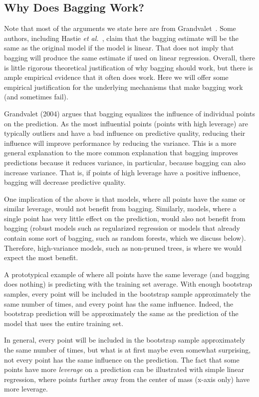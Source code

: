 \begin{refsection}
\subsection*{Why Does Bagging Work?}

Note that most of the arguments we state here are from Grandvalet~\cite{Grandvalet2004}. Some authors, including Hastie {\em et al.}~\cite{2016-Hastie}, claim that the bagging estimate will be the same as the original model if the model is linear. That does not imply that bagging will produce the same estimate if used on linear regression. Overall, there is little rigorous theoretical justification of why bagging should work, but there is ample empirical evidence that it often does work. Here we will offer some empirical justification for the underlying mechanisms that make bagging work (and sometimes fail).

Grandvalet (2004) argues that bagging equalizes the influence of individual points on the prediction. As the most influential points (points with high leverage) are typically outliers and have a bad influence on predictive quality, reducing their influence will improve performance by reducing the variance. This is a more general explanation to the more common explanation that bagging improves predictions because it reduces variance, in particular, because bagging can also increase variance. That is, if points of high leverage have a positive influence, bagging will decrease predictive quality.

One implication of the above is that models, where all points have the same or similar leverage, would not benefit from bagging. Similarly, models, where a single point has very little effect on the prediction, would also not benefit from bagging (robust models such as regularized regression or models that already contain some sort of bagging, such as random forests, which we discuss below). Therefore, high-variance models, such as non-pruned trees, is where we would expect the most benefit.

A prototypical example of where all points have the same leverage (and bagging does nothing) is predicting with the training set average. With enough bootstrap samples, every point will be included in the bootstrap sample approximately the same number of times, and every point has the same influence. Indeed, the bootstrap prediction will be approximately the same as the prediction of the model that uses the entire training set.

In general, every point will be included in the bootstrap sample approximately the same number of times, but what is at first maybe even somewhat surprising, not every point has the same influence on the prediction. The fact that some points have more {\em leverage} on a prediction can be illustrated with simple linear regression, where points further away from the center of mass (x-axis only) have more leverage. 


\end{refsection}
